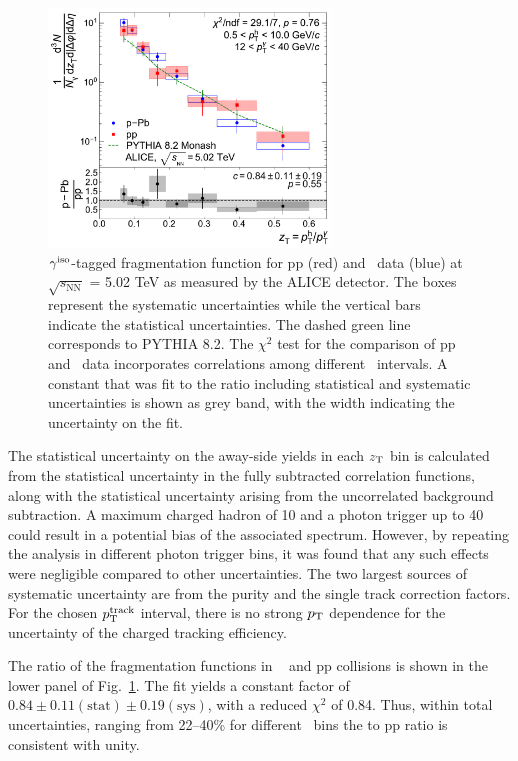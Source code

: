 \begin{figure}
    \centering
    \includegraphics[width=0.67\textwidth]{Data_Analysis/gammahadron/Final_FFunction_and_Ratio.pdf}
    \caption{$\gamma^\mathrm{iso}$-tagged fragmentation function for pp (red) and \pPb~data (blue) at $\sqrt{s_\mathrm{NN}}$ = 5.02 TeV as measured by the ALICE detector. The boxes represent the systematic uncertainties while the vertical bars indicate the statistical uncertainties. The dashed green line corresponds to \textsc{PYTHIA 8.2}. The $\chi^2$ test for the comparison of pp and \pPb~data incorporates correlations among different \zt~intervals. A constant that was fit to the ratio including statistical and systematic uncertainties is shown as grey band, with the width indicating the uncertainty on the fit.}
    \label{fig:Fragmentation_Functions}
\end{figure}

The statistical uncertainty on the away-side yields in each $z_{\mathrm{T}}$ bin is calculated from the statistical uncertainty in the fully subtracted correlation functions, along with the statistical uncertainty arising from the uncorrelated background subtraction. A maximum charged hadron \pt of 10 \GeVc and a photon trigger \pt up to 40 \GeVc could result in a potential bias of the associated \zt spectrum. However, by repeating the analysis in different photon trigger \pt bins, it was found that any such effects were negligible compared to other uncertainties. The two largest sources of systematic uncertainty are from the purity and the single track correction factors. For the chosen $p_{\mathrm{T}}^{\mathrm{track}}$ interval, there is no strong $p_{\mathrm{T}}$ dependence for the uncertainty of the charged tracking efficiency.

 The ratio of the fragmentation functions in \pPb~ and pp collisions is shown in the lower panel of Fig.~\ref{fig:Fragmentation_Functions}.
The fit yields a constant factor of $0.84\pm0.11\mathrm{(stat)}\pm0.19\mathrm{(sys)}$, with a reduced $\chi^{2}$ of 0.84.  
 Thus, within total uncertainties, ranging from 22--40\% for different \zt~bins the \pPb to pp ratio is consistent with unity. %

